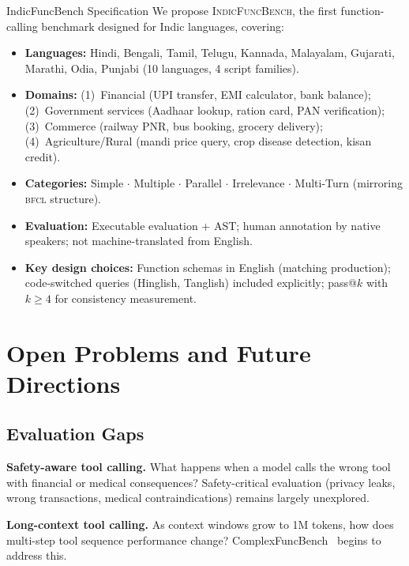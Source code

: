 \documentclass[11pt]{article}
\newcommand{\bfcl}{\textsc{bfcl}}
\begin{document}
\begin{researchbox}{IndicFuncBench Specification}
We propose \textsc{IndicFuncBench}, the first function-calling benchmark designed for Indic
languages, covering:
\begin{itemize}[leftmargin=1.0em, itemsep=2pt, topsep=2pt]
  \item \textbf{Languages:} Hindi, Bengali, Tamil, Telugu, Kannada, Malayalam, Gujarati, Marathi,
        Odia, Punjabi (10 languages, 4 script families).
  \item \textbf{Domains:} (1)~Financial (UPI transfer, EMI calculator, bank balance);
        (2)~Government services (Aadhaar lookup, ration card, PAN verification);
        (3)~Commerce (railway PNR, bus booking, grocery delivery);
        (4)~Agriculture/Rural (mandi price query, crop disease detection, kisan credit).
  \item \textbf{Categories:} Simple $\cdot$ Multiple $\cdot$ Parallel $\cdot$ Irrelevance
        $\cdot$ Multi-Turn (mirroring \bfcl{} structure).
  \item \textbf{Evaluation:} Executable evaluation + AST; human annotation by native speakers;
        not machine-translated from English.
  \item \textbf{Key design choices:} Function schemas in English (matching production);
        code-switched queries (Hinglish, Tanglish) included explicitly;
        pass@$k$ with $k \geq 4$ for consistency measurement.
\end{itemize}
\end{researchbox}

\section{Open Problems and Future Directions}
\label{sec:openproblems}

\subsection{Evaluation Gaps}

\textbf{Safety-aware tool calling.} What happens when a model calls the wrong tool with financial
or medical consequences? Safety-critical evaluation (privacy leaks, wrong transactions, medical
contraindications) remains largely unexplored.

\textbf{Long-context tool calling.} As context windows grow to 1M tokens, how does multi-step tool
sequence performance change? ComplexFuncBench~\citep{zhong2025complexfuncbench} begins to address
this.
\end{document}
